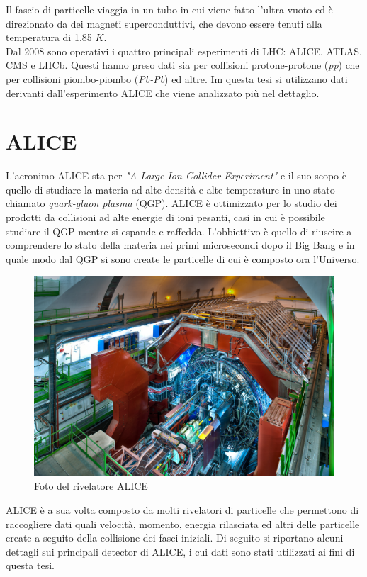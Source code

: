 Il fascio di particelle viaggia in un tubo in cui viene fatto l'ultra-vuoto ed è direzionato da dei magneti superconduttivi, che devono essere tenuti alla temperatura di 1.85 $K$.
\\Dal 2008 sono operativi i quattro principali esperimenti di LHC: ALICE, ATLAS, CMS e LHCb. Questi hanno preso dati sia per collisioni protone-protone (\textit{pp}) che per collisioni piombo-piombo (\textit{Pb-Pb}) ed altre. Im questa tesi si utilizzano dati derivanti dall'esperimento ALICE che viene analizzato più nel dettaglio. \cite{sito_cern_LHC} 



\section{ALICE}

L'acronimo ALICE sta per \textit{"A Large Ion Collider Experiment"} e il suo scopo è quello di studiare la materia ad alte densità e alte temperature in uno stato chiamato \textit{quark-gluon plasma} (QGP). ALICE è ottimizzato per lo studio dei prodotti da collisioni ad alte energie di ioni pesanti, casi in cui è possibile studiare il QGP mentre si espande e raffedda. L'obbiettivo è quello di riuscire a comprendere lo stato della materia nei primi microsecondi dopo il Big Bang e in quale modo dal QGP si sono create le particelle di cui è composto ora l'Universo. \cite{sito_cern_ALICE} 
    
    \begin{figure}[htbp]
        \centering
        \includegraphics[width=0.6\linewidth]{ALICE/ALICE_LRsaba_CERN_0212_3219.jpg}
        \caption{Foto del rivelatore ALICE}
        \label{fig:ALICEcomplex}
    \end{figure}
    
ALICE è a sua volta composto da molti rivelatori di particelle che permettono di raccogliere dati quali velocità, momento, energia rilasciata ed altri delle particelle create a seguito della collisione dei fasci iniziali. Di seguito si riportano alcuni dettagli sui principali detector di ALICE, i cui dati sono stati utilizzati ai fini di questa tesi.

